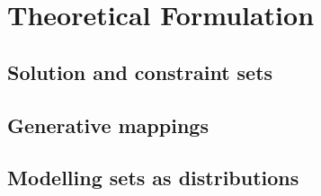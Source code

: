 \documentclass[../main.tex]{subfiles}
\begin{document}
\chapter{Theoretical Formulation}

\section{Solution and constraint sets}

\section{Generative mappings}

\section{Modelling sets as distributions}
\end{document}
